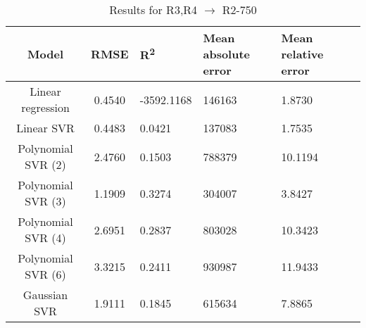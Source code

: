 \begin{table}[H]
\centering
\begin{adjustbox}{center}
\begin{tabular}{c | c M{1.2cm} M{2.5cm} M{2.5cm} M{1.8cm}}
Model & RMSE & R\textsuperscript{2} & Mean absolute error & Mean relative error \tabularnewline
\hline
Linear regression & 0.4540 & -3592.1168 & 146163 & 1.8730 \\
Linear SVR & 0.4483 & 0.0421 & 137083 & 1.7535 \\
Polynomial SVR (2) & 2.4760 & 0.1503 & 788379 & 10.1194 \\
Polynomial SVR (3) & 1.1909 & 0.3274 & 304007 & 3.8427 \\
Polynomial SVR (4) & 2.6951 & 0.2837 & 803028 & 10.3423 \\
Polynomial SVR (6) & 3.3215 & 0.2411 & 930987 & 11.9433 \\
Gaussian SVR & 1.9111 & 0.1845 & 615634 & 7.8865 \\
\end{tabular}
\end{adjustbox}
\\
\caption{Results for R3,R4 $\rightarrow$ R2-750}
\label{tab:coreonly_linear_R3,R4_R2_750}
\end{table}
